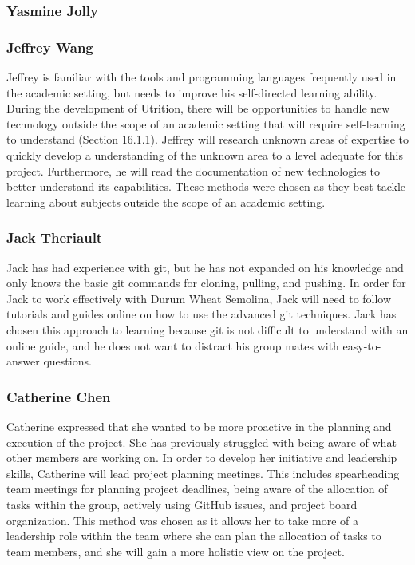\documentclass[12pt]{article}
\begin{document}
\subsubsection{Yasmine Jolly}
\subsubsection{Jeffrey Wang}
Jeffrey is familiar with the tools and programming languages frequently 
used in the academic setting, but needs to improve his self-directed learning 
ability. During the development of Utrition, there will be opportunities to 
handle new technology outside the scope of an academic setting that will 
require self-learning to understand (Section 16.1.1). Jeffrey will research 
unknown areas of expertise to quickly develop a understanding of the unknown 
area to a level adequate for this project. Furthermore, he will read the 
documentation of new technologies to better understand its capabilities. These 
methods were chosen as they best tackle learning about subjects outside the 
scope of an academic setting.
\subsubsection{Jack Theriault}
Jack has had experience with git, but he has not expanded on his knowledge and only knows the basic git commands for cloning, pulling, and pushing. In order for Jack to work effectively with Durum Wheat Semolina, Jack will need to follow tutorials and guides online on how to use the advanced git techniques. Jack has chosen this approach to learning because git is not difficult to understand with an online guide, and he does not want to distract his group mates with easy-to-answer questions.

\subsubsection{Catherine Chen}
Catherine expressed that she wanted to be more proactive in the planning and execution of the project. She has previously struggled with being aware of  what other members are working on. In order to develop her initiative and leadership skills, Catherine will lead project planning meetings. This includes spearheading team meetings for planning project deadlines, being aware of the allocation of tasks within the group, actively using GitHub issues, and project board organization. This method was chosen as it allows her to take more of a leadership role within the team where she can plan the allocation of tasks to team members, and she will gain a more holistic view on the project.
\end{document}
